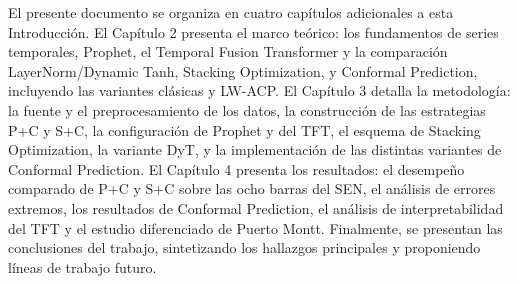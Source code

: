 El presente documento se organiza en cuatro capítulos adicionales a esta Introducción. El Capítulo 2 presenta el marco teórico: los fundamentos de series temporales, Prophet, el Temporal Fusion Transformer y la comparación LayerNorm/Dynamic Tanh, Stacking Optimization, y Conformal Prediction, incluyendo las variantes clásicas y LW-ACP. El Capítulo 3 detalla la metodología: la fuente y el preprocesamiento de los datos, la construcción de las estrategias P+C y S+C, la configuración de Prophet y del TFT, el esquema de Stacking Optimization, la variante DyT, y la implementación de las distintas variantes de Conformal Prediction. El Capítulo 4 presenta los resultados: el desempeño comparado de P+C y S+C sobre las ocho barras del SEN, el análisis de errores extremos, los resultados de Conformal Prediction, el análisis de interpretabilidad del TFT y el estudio diferenciado de Puerto Montt. Finalmente, se presentan las conclusiones del trabajo, sintetizando los hallazgos principales y proponiendo líneas de trabajo futuro.